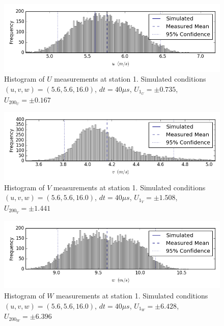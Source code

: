 \begin{figure}[H]
\centering
\includegraphics[width=6in]{figs/Ely_May28th01002/uncertainty_Ely_May28th01002_U}
\caption{Histogram of $U$ measurements at station 1. Simulated conditions $(u,v,w)=(5.6, 5.6, 16.0)$, $dt=40 \mu s$, $U_1_U=\pm 0.735$, $U_200_U=\pm 0.167$}
\label{fig:uncertainty_Ely_May28th01002_U}
\end{figure}


\begin{figure}[H]
\centering
\includegraphics[width=6in]{figs/Ely_May28th01002/uncertainty_Ely_May28th01002_V}
\caption{Histogram of $V$ measurements at station 1. Simulated conditions $(u,v,w)=(5.6, 5.6, 16.0)$, $dt=40 \mu s$, $U_1_V=\pm 1.508$, $U_200_V=\pm 1.441$}
\label{fig:uncertainty_Ely_May28th01002_V}
\end{figure}


\begin{figure}[H]
\centering
\includegraphics[width=6in]{figs/Ely_May28th01002/uncertainty_Ely_May28th01002_W}
\caption{Histogram of $W$ measurements at station 1. Simulated conditions $(u,v,w)=(5.6, 5.6, 16.0)$, $dt=40 \mu s$, $U_1_W=\pm 6.428$, $U_200_W=\pm 6.396$}
\label{fig:uncertainty_Ely_May28th01002_W}
\end{figure}


